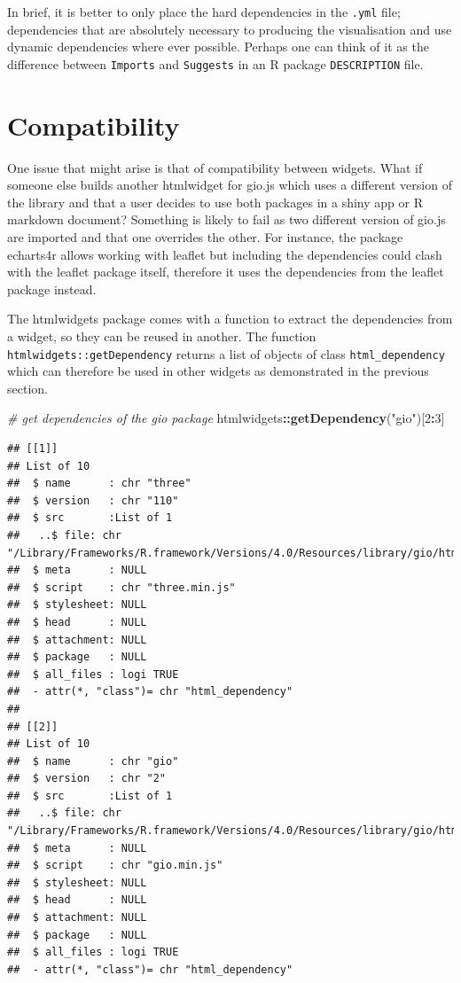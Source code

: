 \documentclass[
]{krantz}
\makeatletter
\newenvironment{Shaded}{\begin{snugshade}}{\end{snugshade}}
\newcommand{\CommentTok}[1]{\textcolor[rgb]{0.37,0.37,0.37}{\textit{#1}}}
\newcommand{\DecValTok}[1]{\textcolor[rgb]{0.06,0.06,0.06}{#1}}
\newcommand{\KeywordTok}[1]{\textcolor[rgb]{0.27,0.27,0.27}{\textbf{#1}}}
\newcommand{\NormalTok}[1]{#1}
\newcommand{\OperatorTok}[1]{\textcolor[rgb]{0.43,0.43,0.43}{\textbf{#1}}}
\newcommand{\StringTok}[1]{\textcolor[rgb]{0.5,0.5,0.5}{#1}}
\newenvironment{kframe}{%
\medskip{}
\setlength{\fboxsep}{.8em}
 \def\at@end@of@kframe{}%
 \ifinner\ifhmode%
  \def\at@end@of@kframe{\end{minipage}}%
  \begin{minipage}{\columnwidth}%
 \fi\fi%
 \def\FrameCommand##1{\hskip\@totalleftmargin \hskip-\fboxsep
 \colorbox{shadecolor}{##1}\hskip-\fboxsep
     \hskip-\linewidth \hskip-\@totalleftmargin \hskip\columnwidth}%
 \MakeFramed {\advance\hsize-\width
   \@totalleftmargin\z@ \linewidth\hsize
   \@setminipage}}%
 {\par\unskip\endMakeFramed%
 \at@end@of@kframe}
\renewenvironment{Shaded}{\begin{kframe}}{\end{kframe}}
\makeatother
\begin{document}
In brief, it is better to only place the hard dependencies in the \texttt{.yml} file; dependencies that are absolutely necessary to producing the visualisation and use dynamic dependencies where ever possible. Perhaps one can think of it as the difference between \texttt{Imports} and \texttt{Suggests} in an R package \texttt{DESCRIPTION} file.

\hypertarget{widgets-adv-compatibility}{%
\section{Compatibility}\label{widgets-adv-compatibility}}

One issue that might arise is that of compatibility between widgets. What if someone else builds another htmlwidget for gio.js which uses a different version of the library and that a user decides to use both packages in a shiny app or R markdown document? Something is likely to fail as two different version of gio.js are imported and that one overrides the other. For instance, the package echarts4r \citep{R-echarts4r} allows working with leaflet but including the dependencies could clash with the leaflet package itself, therefore it uses the dependencies from the leaflet package instead.

The htmlwidgets package comes with a function to extract the dependencies from a widget, so they can be reused in another. The function \texttt{htmlwidgets::getDependency} returns a list of objects of class \texttt{html\_dependency} which can therefore be used in other widgets as demonstrated in the previous section.

\begin{Shaded}
\begin{Highlighting}[]
\CommentTok{\# get dependencies of the gio package}
\NormalTok{htmlwidgets}\OperatorTok{::}\KeywordTok{getDependency}\NormalTok{(}\StringTok{"gio"}\NormalTok{)[}\DecValTok{2}\OperatorTok{:}\DecValTok{3}\NormalTok{]}
\end{Highlighting}
\end{Shaded}

\begin{verbatim}
## [[1]]
## List of 10
##  $ name      : chr "three"
##  $ version   : chr "110"
##  $ src       :List of 1
##   ..$ file: chr "/Library/Frameworks/R.framework/Versions/4.0/Resources/library/gio/htmlwidgets/three"
##  $ meta      : NULL
##  $ script    : chr "three.min.js"
##  $ stylesheet: NULL
##  $ head      : NULL
##  $ attachment: NULL
##  $ package   : NULL
##  $ all_files : logi TRUE
##  - attr(*, "class")= chr "html_dependency"
## 
## [[2]]
## List of 10
##  $ name      : chr "gio"
##  $ version   : chr "2"
##  $ src       :List of 1
##   ..$ file: chr "/Library/Frameworks/R.framework/Versions/4.0/Resources/library/gio/htmlwidgets/gio"
##  $ meta      : NULL
##  $ script    : chr "gio.min.js"
##  $ stylesheet: NULL
##  $ head      : NULL
##  $ attachment: NULL
##  $ package   : NULL
##  $ all_files : logi TRUE
##  - attr(*, "class")= chr "html_dependency"
\end{verbatim}
\end{document}
